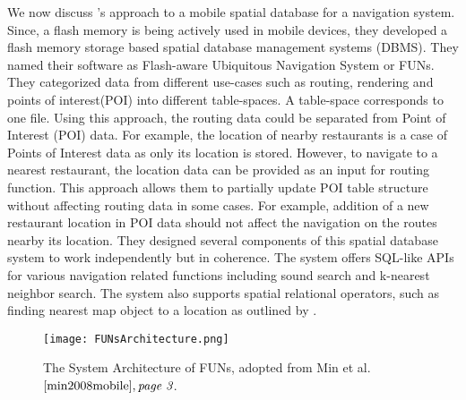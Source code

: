 We now discuss \citet{min2008mobile}'s approach to a mobile spatial database for a navigation system. Since, a flash memory is being actively used in mobile devices, they developed a flash memory storage based spatial database management systems (DBMS). They named their software as Flash-aware Ubiquitous Navigation System or FUNs. They categorized data from different use-cases such as routing, rendering and points of interest(POI) into different table-spaces. A table-space corresponds to one file. Using this approach, the routing data could be separated from Point of Interest (POI) data. For example, the location of nearby restaurants is a case of Points of Interest data as only its location is stored. However, to navigate to a nearest restaurant, the location data can be provided as an input for routing function. This approach allows them to partially update POI table structure without affecting routing data in some cases. For example, addition of a new restaurant location in POI data should not affect the navigation on the routes nearby its location. They designed several components of this spatial database system to work independently but in coherence. The system offers SQL-like APIs for various navigation related functions including sound search and k-nearest neighbor search. The system also supports spatial relational operators, such as finding nearest map object to a location as outlined by \citet{lee1998perf}. \\
\begin{figure}
\centering
\texttt{[image: FUNsArchitecture.png]}
\caption{The System Architecture of FUNs, adopted from Min et al.$\cite{min2008mobile}, \textit{page 3}$.}
\label{fg:sysArchFun}
\end{figure}

